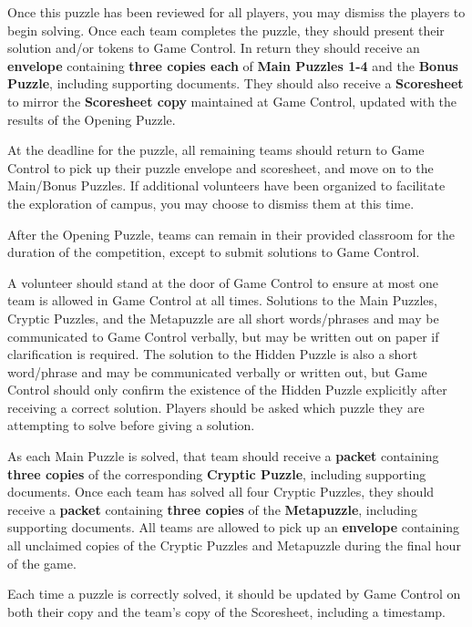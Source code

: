 Once this puzzle has been reviewed for all players, you may dismiss the players
to begin solving. Once each team completes the puzzle, they should present
their solution and/or tokens to Game Control. In return they should receive
an \textbf{envelope} containing \textbf{three copies each} of
\textbf{Main Puzzles 1-4} and the \textbf{Bonus Puzzle}, including supporting
documents. They should also
receive a \textbf{Scoresheet} to mirror the \textbf{Scoresheet copy} maintained
at Game Control, updated with the results of the Opening Puzzle.

At the deadline for the puzzle, all remaining teams should return to
Game Control to pick up their puzzle envelope and scoresheet, and move
on to the Main/Bonus Puzzles. If additional
volunteers have been organized to facilitate the exploration of campus,
you may choose to dismiss them at this time.


After the Opening Puzzle,
teams can remain in their provided classroom for the duration of the
competition, except to submit solutions to Game Control.

A volunteer should stand at the door of Game Control to ensure at most
one team is allowed in Game Control at all times. Solutions to the
Main Puzzles, Cryptic Puzzles, and the Metapuzzle are all short words/phrases
and may be communicated to Game Control verbally, but may be written out
on paper if clarification is required. The solution to the Hidden Puzzle
is also a short word/phrase and may be communicated verbally or written out,
but Game Control should only confirm the existence of the Hidden Puzzle
explicitly after receiving a correct solution. Players should be asked
which puzzle they are attempting to solve before giving a solution.

As each Main Puzzle is solved, that team should receive a \textbf{packet}
containing \textbf{three copies} of the corresponding \textbf{Cryptic Puzzle},
including supporting documents.
Once each team has solved all four Cryptic Puzzles, they should receive a
\textbf{packet} containing \textbf{three copies} of the \textbf{Metapuzzle},
including supporting documents.
All teams are allowed to pick up an \textbf{envelope} containing all
unclaimed copies of the Cryptic Puzzles and Metapuzzle during the final hour
of the game.

Each time a puzzle is correctly solved, it should be updated by Game Control
on both their copy and the team's copy of the Scoresheet, including a
timestamp.

